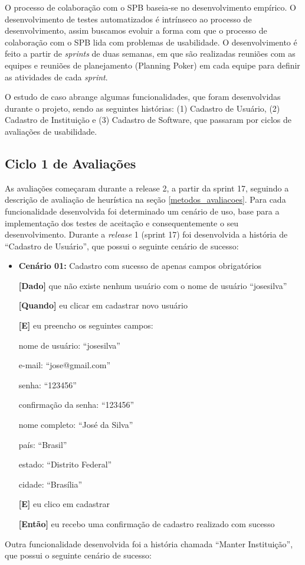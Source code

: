 O processo de colaboração com o SPB baseia-se no desenvolvimento empírico. O desenvolvimento de testes automatizados é intrínseco ao processo de desenvolvimento, assim buscamos evoluir a forma com que o processo de colaboração com o SPB lida com problemas de usabilidade.
O desenvolvimento é feito a partir de \textit{sprints} de duas semanas, em que são realizadas reuniões com as equipes e reuniões de planejamento (Planning Poker) em cada equipe para definir as atividades de cada \textit{sprint}.

O estudo de caso abrange algumas funcionalidades, que foram desenvolvidas durante o projeto, sendo as seguintes histórias: (1) Cadastro de Usuário, (2) Cadastro de Instituição e (3) Cadastro de Software, que passaram por ciclos de avaliações de usabilidade. 

\subsection{Ciclo 1 de Avaliações}

As avaliações começaram durante a release 2, a partir da sprint 17, seguindo a descrição de avaliação de heurística na seção \ref{metodos_avaliacoes}.
%
Para cada funcionalidade desenvolvida foi determinado um cenário de uso, base para a implementação dos testes de aceitação e consequentemente o seu desenvolvimento.
%
Durante a \textit{release} 1 (sprint 17) foi desenvolvida a história de ``Cadastro de Usuário'', que possui o seguinte cenário de sucesso:

	\begin{itemize}
	\item\textbf{Cenário 01:} Cadastro com sucesso de apenas campos obrigatórios

	\textbf{[Dado]} que não existe nenhum usuário com o nome de usuário ``josesilva''

	\textbf{[Quando]} eu clicar em cadastrar novo usuário

	\textbf{[E]} eu preencho os seguintes campos: 

  		\subitem nome de usuário: ``josesilva''

  		\subitem e-mail: ``jose@gmail.com''

  		\subitem senha: ``123456''

  		\subitem confirmação da senha: ``123456''

  		\subitem nome completo: ``José da Silva''

  		\subitem país: ``Brasil''

  		\subitem estado: ``Distrito Federal''

  		\subitem cidade: ``Brasília''

	\textbf{[E]} eu clico em cadastrar

	\textbf{[Então]} eu recebo uma confirmação de cadastro realizado com sucesso
	\end{itemize}
Outra funcionalidade desenvolvida foi a história chamada ``Manter Instituição'', que possui o seguinte cenário de sucesso:

